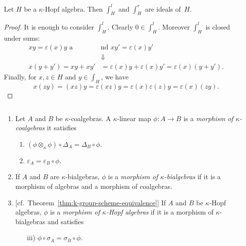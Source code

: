 \begin{prop}
    Let $H$ be a $\kappa$-Hopf algebra. Then $\int_H^l$ and $\int_H^r$ are ideals of~$H$.
\end{prop}

\begin{proof} It is enough to consider $\int_H^l$. Clearly $0\in\int_H^l$. Moreover $\int_H^l$ is closed under sums:
    \begin{align*}
        xy = \varepsilon(x)y\text{ a}&\text{nd }xy'=\varepsilon(x)y'\\
            &\!\Downarrow\\
            x(y+y') = xy + xy' &= \varepsilon(x)y + \varepsilon(x)y'
                = \varepsilon(x)(y+y').
    \end{align*}
    Finally, for $x,z\in H$ and $y\in\int_H$, we have
    $$
        x(zy) = (xz)y = \varepsilon(xz)y = \varepsilon(x)\varepsilon(z)y
            = \varepsilon(x)(zy).
    $$
\end{proof}


\begin{defns}${}$
    \begin{enumerate}[-]
        \item Let $A$ and $B$ be $\kappa$-coalgebras. A $\kappa$-linear map $\phi\colon A\to B$ is a \textsl{morphism of $\kappa$-coalgebras} it satisfies
        \begin{enumerate}[\rm i)]
            \item $(\phi\otimes_\kappa\phi)\circ\Delta_A=\Delta_B\circ\phi$.
            \item $\varepsilon_A=\varepsilon_B\circ\phi$.
        \end{enumerate}
    
        \item If $A$ and $B$ are $\kappa$-bialgebras, $\phi$ is a \textsl{morphism of $\kappa$-bialgebras} if it is a morphism of algebras and a morphism of coalgebras.
    
        \item {\rm[cf.~Theorem~\ref{thm:k-group-scheme-equivalence}]} If $A$ and $B$ be $\kappa$-Hopf algebras, $\phi$ is a \textsl{morphism of $\kappa$-Hopf algebras} if it is a morphism of $\kappa$-bialgebras and satisfies
        \begin{enumerate}
            \item[iii)] $\phi\circ\sigma_A=\sigma_B\circ\phi$.
        \end{enumerate}
    \end{enumerate}
\end{defns}

